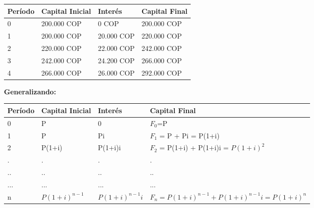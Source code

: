 \begin{table}[htbp]
   \begin{center}
      \begin{tabular}{|l|l|l|l|}
         \hline
         Período & Capital Inicial & Interés     & Capital Final \\
         \hline
         0 & 200.000 COP & 0 COP      & 200.000 COP \\ \hline
         1 & 200.000 COP & 20.000 COP & 220.000 COP \\ \hline
         2 & 220.000 COP & 22.000 COP & 242.000 COP \\ \hline
         3 & 242.000 COP & 24.200 COP & 266.000 COP \\ \hline
         4 & 266.000 COP & 26.000 COP & 292.000 COP \\ \hline
      \end{tabular}
      \label{tabla:interesCompuesto1}
   \end{center}
\end{table}
\textbf{Generalizando:}\\
\begin{table}[htbp]
   \begin{center}
      \begin{tabular}{|l|l|l|l|}
         \hline
         Período & Capital Inicial & Interés         & Capital Final                                       \\
         \hline
         0       & P               & 0               & $F_{0}$=P                                           \\ \hline
         1       & P               & Pi              & $F_{1}$ = P + Pi = P(1+i)                           \\ \hline
         2       & P(1+i)          & P(1+i)i         & $F_{2}$ = P(1+i) + P(1+i)i = $P(1+i)^{2}$           \\ \hline
         .       & .               & .               & .                                                   \\ \hline
         ..      & ..              & ..              & ..                                                  \\ \hline
         ...     & ...             & ...             & ...                                                 \\ \hline
         n       & $P(1+i)^{n-1}$  & $P(1+i)^{n-1}i$ & $F_{n} = P(1+i)^{n-1} + P(1+i)^{n-1}i = P(1+i)^{n}$ \\ \hline
      \end{tabular}
      \label{tabla:interesCompuesto2}
   \end{center}
\end{table}

